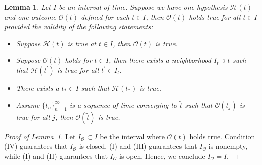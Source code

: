 \documentclass[12pt,letterpaper]{article}
\newtheorem{lem}[thm]{Lemma}
\theoremstyle{plain}
\begin{document}
\begin{lem}\label{Bootstrap Lemma}
    Let $I$ be an interval of time. Suppose we have one hypothesis $\mathscr H(t)$ and one outcome $\mathscr O(t)$ defined for each $t\in I$, then $\mathscr O(t)$ holds true for all $t\in I$ provided the validity of the following statements:
    \begin{itemize}
        \item [(I)] Suppose $\mathscr H(t)$ is true at $t\in I$, then $\mathscr O(t)$ is true.

        \item [(II)] Suppose $\mathscr O(t)$ holds for $t\in I$, then there exists a neighborhood $I_t\owns t$ such that $\mathscr H(t^\prime)$ is true for all $t^\prime\in I_t$.

        \item [(III)] There exists a $t_*\in I$ such that $\mathscr H(t_*)$ is true.

        \item [(IV)] Assume $\{t_n\}_{n=1}^\infty$ is a sequence of time converging to $\tilde t$ such that $\mathscr O(t_j)$ is true for all $j$, then $\mathscr O(\tilde t)$ is true.
    \end{itemize}
\end{lem}

\begin{proof}[Proof of Lemma~\ref{Bootstrap Lemma}]

Let $I_{\mathscr O}\subset I$ be the interval where $\mathscr O(t)$ holds true. Condition (IV) guarantees that $I_{\mathscr O}$ is closed, (I) and (III) guarantees that $I_{\mathscr O}$ is nonempty, while (I) and (II) guarantees that $I_{\mathscr O}$ is open. Hence, we conclude $I_{\mathscr O}=I$. 
    
\end{proof}
\end{document}
